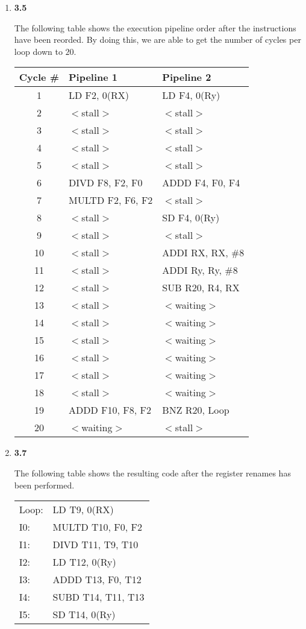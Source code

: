 \documentclass[10pt]{article} %
\begin{document}
\begin{enumerate}
\item %

\textbf{3.5}

The following table shows the execution pipeline order after the instructions have been reorded.  By doing this, we are able to get the number of cycles per loop down to $20$.  

\begin{center}
\begin{tabular}{| c | l | l |}
\hline
Cycle \# & Pipeline 1 & Pipeline 2 \\
\hline
1 & LD F2, 0(RX) & LD F4, 0(Ry) \\
2 & $<$stall$>$ & $<$stall$>$ \\
3 & $<$stall$>$ & $<$stall$>$ \\
4 & $<$stall$>$ & $<$stall$>$ \\
5 & $<$stall$>$ & $<$stall$>$ \\
6 & DIVD F8, F2, F0 & ADDD F4, F0, F4 \\
7 & MULTD F2, F6, F2 & $<$stall$>$ \\
8 & $<$stall$>$ & SD F4, 0(Ry) \\
9 & $<$stall$>$ & $<$stall$>$ \\
10 & $<$stall$>$ & ADDI RX, RX, \#8 \\
11 & $<$stall$>$ & ADDI Ry, Ry, \#8 \\
12 & $<$stall$>$ & SUB R20, R4, RX \\
13 & $<$stall$>$ & $<$waiting$>$ \\
14 & $<$stall$>$ & $<$waiting$>$ \\
15 & $<$stall$>$ & $<$waiting$>$ \\
16 & $<$stall$>$ & $<$waiting$>$ \\
17 & $<$stall$>$ & $<$waiting$>$ \\
18 & $<$stall$>$ & $<$waiting$>$ \\
19 & ADDD F10, F8, F2 & BNZ R20, Loop \\
20 & $<$waiting$>$ & $<$stall$>$ \\
\hline
\end{tabular}
\end{center}

\item %

\textbf{3.7}

The following table shows the resulting code after the register renames has been performed.  

\begin{center}
\begin{tabular}{| l | l |}
\hline
Loop: & LD T9, 0(RX) \\
I0: & MULTD T10, F0, F2 \\
I1: & DIVD T11, T9, T10 \\
I2: & LD T12, 0(Ry) \\
I3: & ADDD T13, F0, T12 \\
I4: & SUBD T14, T11, T13 \\
I5: & SD T14, 0(Ry) \\
\hline
\end{tabular}
\end{center}


\end{enumerate}
\end{document}
